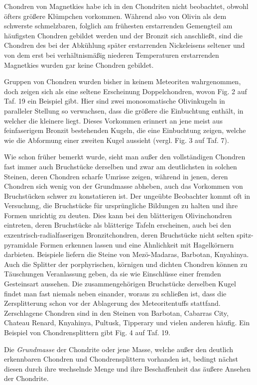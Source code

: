 \documentclass[a4paper, 11pt, oneside, polutonikogreek, german]{article}
\begin{document}
Chondren von Magnetkies habe ich in den Chondriten nicht beobachtet, obwohl öfters größere Klümpchen vorkommen. Während also von Olivin als dem schwerste schmelzbaren, folglich am frühesten erstarrenden Gemengteil am häufigsten Chondren gebildet werden und der Bronzit sich anschließt, sind die Chondren des bei der Abkühlung später erstarrenden Nickeleisens seltener und von dem erst bei verhältnismäßig niederen Temperaturen erstarrenden Magnetkies wurden gar keine Chondren gebildet.

Gruppen von Chondren wurden bisher in keinem Meteoriten wahrgenommen, doch zeigen sich als eine seltene Erscheinung Doppelchondren, wovon Fig. 2 auf Taf. 19 ein Beispiel gibt. Hier sind zwei monosomatische Olivinkugeln in paralleler Stellung so verwachsen, dass die größere die Einbuchtung enthält, in welcher die kleinere liegt. Dieses Vorkommen erinnert an jene meist aus feinfaserigem Bronzit bestehenden Kugeln, die eine Einbuchtung zeigen, welche wie die Abformung einer zweiten Kugel aussieht (vergl. Fig. 3 auf Taf. 7).

Wie schon früher bemerkt wurde, sieht man außer den vollständigen Chondren fast immer auch Bruchstücke derselben und zwar am deutlichsten in solchen Steinen, deren Chondren scharfe Umrisse zeigen, während in jenen, deren Chondren sich wenig von der Grundmasse abheben, auch das Vorkommen von Bruchstücken schwer zu konstatieren ist. Der ungeübte Beobachter kommt oft in Versuchung, die Bruchstücke für ursprüngliche Bildungen zu halten und ihre Formen unrichtig zu deuten. Dies kann bei den blätterigen Olivinchondren eintreten, deren Bruchstücke als blätterige Tafeln erscheinen, auch bei den exzentrisch-radialfaserigen Bronzitchondren, deren Bruchstücke nicht selten spitz-pyramidale Formen erkennen lassen und eine Ähnlichkeit mit Hagelkörnern darbieten. Beispiele liefern die Steine von Mezö-Madaras, Barbotan, Knyahinya. Auch die Splitter der porphyrischen, körnigen und dichten Chondren können zu Täuschungen Veranlassung geben, da sie wie Einschlüsse einer fremden Gesteinsart aussehen. Die zusammengehörigen Bruchstücke derselben Kugel findet man fast niemals neben einander, woraus zu schließen ist, dass die Zersplitterung schon vor der Ablagerung des Meteoritentuffs stattfand. Zerschlagene Chondren sind in den Steinen von Barbotan, Cabarras City, Chateau Renard, Knyahinya, Pultusk, Tipperary und vielen anderen häufig. Ein Beispiel von Chondrensplittern gibt Fig. 4 auf Taf. 19.

Die \emph{Grundmasse} der Chondrite oder jene Masse, welche außer den deutlich erkennbaren Chondren und Chondrensplittern vorhanden ist, bedingt nächst diesen durch ihre wechselnde Menge und ihre Beschaffenheit das äußere Ansehen der Chondrite.
\end{document}
